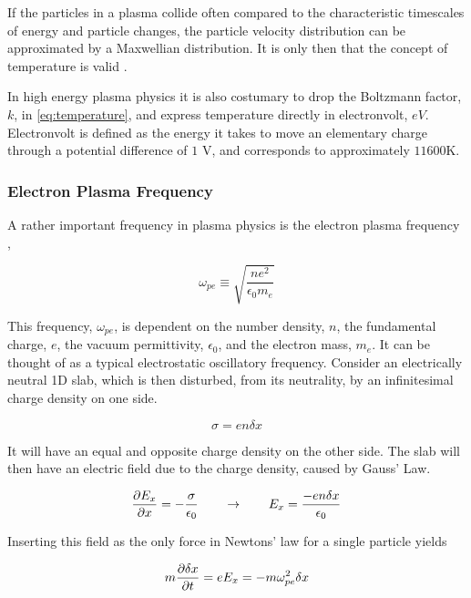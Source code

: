 		If the particles in a plasma collide often compared to the characteristic timescales
		of energy and particle changes, the particle velocity distribution can be approximated
		by a Maxwellian distribution. It is only then that the concept of
		temperature is valid \citep{goldston_introduction_1995}.

		In high energy plasma physics it is also costumary to drop the Boltzmann factor, \(k\),
		in \cref{eq:temperature}, and express temperature directly in electronvolt, \(eV\).
		Electronvolt is defined as the energy it takes to move an elementary charge through
		a potential difference of \(1\) \si{\volt}, and corresponds to approximately
		\(11600 \si{\kelvin}\).

		\subsubsection{Electron Plasma Frequency}
		\label{sec:frequency}
		A rather important frequency in plasma physics is the electron plasma frequency \citep{chen_introduction_1984},

		\begin{equation}
			\omega_{pe} \equiv \sqrt{\frac{ne^2}{\epsilon_0 m_e}}
		\end{equation}

		This frequency, \(\omega_{pe}\), is dependent on the number density, \(n\),
		the fundamental charge, \(e\), the vacuum permittivity, \(\epsilon_0\), and
		the electron mass, \(m_e\).
		It can be thought of as a typical electrostatic oscillatory frequency.
		Consider an electrically neutral 1D slab, which is then disturbed, from its
		neutrality, by an infinitesimal charge density on one side.

		\begin{equation}
			\sigma = en\delta x
		\end{equation}

		It will have an equal and opposite charge density on the other side. The slab
		will then have an electric field due to the charge density, caused by Gauss' Law.

		\begin{equation}
			\pdv{E_x}{x} = -\frac{\sigma}{\epsilon_0} \qquad\rightarrow\qquad
			E_x = \frac{-en\delta x}{\epsilon_0}
		\end{equation}

		Inserting this field as the only force in Newtons' law for a single particle yields

		\begin{equation}
			m\pdv{\delta x}{t} = eE_x = -m\omega_{pe}^2\delta x
		\end{equation}

